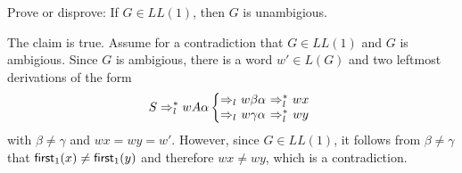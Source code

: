 \begin{exercise}{10}
    Prove or disprove: If $G \in LL(1)$, then $G$ is unambigious.
\end{exercise}

\begin{solution}
    The claim is true. Assume for a contradiction that $G \in LL(1)$ and $G$ is ambigious. Since $G$ is ambigious, there is a word $w' \in L(G)$ and two leftmost derivations of the form 
    \[S \lTo^\ast w A \alpha \left\{
    \begin{array}{@{}*{4}{c@{~}}}
    	\lTo & w \beta \alpha  & \lTo^\ast & wx\\
    	\lTo & w \gamma \alpha & \lTo^\ast & wy
    \end{array}\right.
    \]
    with $\beta \neq \gamma$ and $wx = wy = w'$. However, since $G \in LL(1)$, it follows from $\beta \neq \gamma$ that $\textsf{first}_1(x) \neq \textsf{first}_1(y)$ and therefore $wx \neq wy$, which is a contradiction.
\end{solution}
